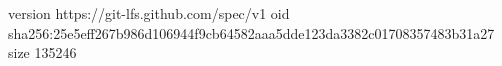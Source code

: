 version https://git-lfs.github.com/spec/v1
oid sha256:25e5eff267b986d106944f9cb64582aaa5dde123da3382c01708357483b31a27
size 135246
